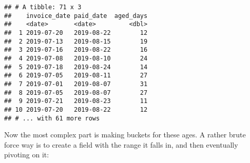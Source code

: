 \documentclass[
]{book}
\newenvironment{Shaded}{\begin{snugshade}}{\end{snugshade}}
\newcommand{\CommentTok}[1]{\textcolor[rgb]{0.56,0.35,0.01}{\textit{#1}}}
\newcommand{\DataTypeTok}[1]{\textcolor[rgb]{0.13,0.29,0.53}{#1}}
\newcommand{\KeywordTok}[1]{\textcolor[rgb]{0.13,0.29,0.53}{\textbf{#1}}}
\newcommand{\NormalTok}[1]{#1}
\newcommand{\OperatorTok}[1]{\textcolor[rgb]{0.81,0.36,0.00}{\textbf{#1}}}
\newcommand{\StringTok}[1]{\textcolor[rgb]{0.31,0.60,0.02}{#1}}
\begin{document}
\begin{Shaded}
\end{Shaded}

\begin{verbatim}
## # A tibble: 71 x 3
##    invoice_date paid_date  aged_days
##    <date>       <date>         <dbl>
##  1 2019-07-20   2019-08-22        12
##  2 2019-07-13   2019-08-15        19
##  3 2019-07-16   2019-08-22        16
##  4 2019-07-08   2019-08-10        24
##  5 2019-07-18   2019-08-24        14
##  6 2019-07-05   2019-08-11        27
##  7 2019-07-01   2019-08-07        31
##  8 2019-07-05   2019-08-07        27
##  9 2019-07-21   2019-08-23        11
## 10 2019-07-20   2019-08-22        12
## # ... with 61 more rows
\end{verbatim}

Now the most complex part is making buckets for these ages. A rather brute force way is to create a field with the range it falls in, and then eventually pivoting on it:
\end{document}
